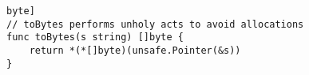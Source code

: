 
\begin{lstlisting}[language=Golang, label=lst:unsafe-string-to-bytes-direct, caption=Incorrect direct cast between string and []byte]
// toBytes performs unholy acts to avoid allocations
func toBytes(s string) []byte {
    return *(*[]byte)(unsafe.Pointer(&s))
}
\end{lstlisting}